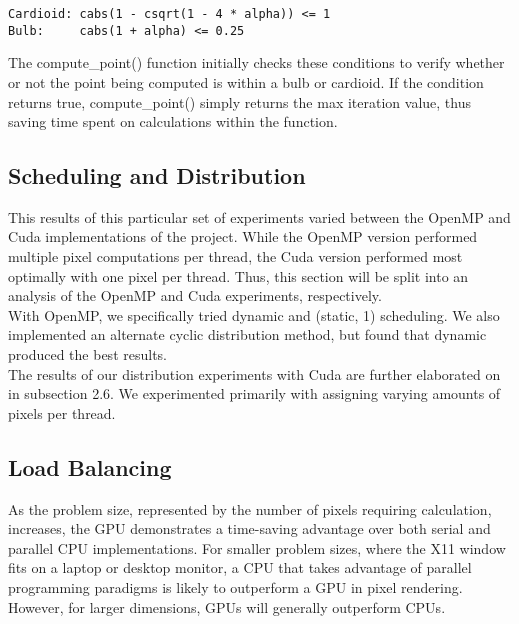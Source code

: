 \documentclass{article}
\begin{document}
\begin{verbatim}
Cardioid: cabs(1 - csqrt(1 - 4 * alpha)) <= 1
Bulb:     cabs(1 + alpha) <= 0.25
\end{verbatim}

The compute\_point() function initially checks these conditions to verify whether or not the point being computed is within a bulb or cardioid. If the condition returns true, compute\_point() simply returns the max iteration value, thus saving time spent on calculations within the function.

\subsection{Scheduling and Distribution}

This results of this particular set of experiments varied between the OpenMP and Cuda implementations of the project. While the OpenMP version performed multiple pixel computations per thread, the Cuda version performed most optimally with one pixel per thread. Thus, this section will be split into an analysis of the OpenMP and Cuda experiments, respectively.\\

With OpenMP, we specifically tried dynamic and (static, 1) scheduling. We also implemented an alternate cyclic distribution method, but found that dynamic produced the best results. \\

The results of our distribution experiments with Cuda are further elaborated on in subsection 2.6. We experimented primarily with assigning varying amounts of pixels per thread. 

\subsection{Load Balancing}

As the problem size, represented by the number of pixels requiring calculation, increases, the GPU demonstrates a time-saving advantage over both serial and parallel CPU implementations. For smaller problem sizes, where the X11 window fits on a laptop or desktop monitor, a CPU that takes advantage of parallel programming paradigms is likely to outperform a GPU in pixel rendering. However, for larger dimensions, GPUs will generally outperform CPUs.\\
\end{document}

